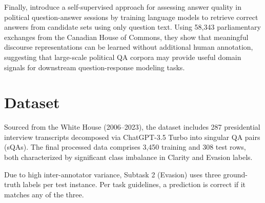 \documentclass[11pt]{article}
\begin{document}
Finally, \citet{b9} introduce a self-supervised approach for assessing answer quality in political question-answer sessions by training language models to retrieve correct answers from candidate sets using only question text. Using 58,343 parliamentary exchanges from the Canadian House of Commons, they show that meaningful discourse representations can be learned without additional human annotation, suggesting that large-scale political QA corpora may provide useful domain signals for downstream question-response modeling tasks.

\section{Dataset}

Sourced from the White House (2006–2023), the dataset includes 287 presidential interview transcripts decomposed via ChatGPT-3.5 Turbo into singular QA pairs (sQAs). The final processed data comprises 3,450 training and 308 test rows, both characterized by significant class imbalance in Clarity and Evasion labels.

Due to high inter-annotator variance, Subtask 2 (Evasion) uses three ground-truth labels per test instance. Per task guidelines, a prediction is correct if it matches any of the three.





\end{document}
